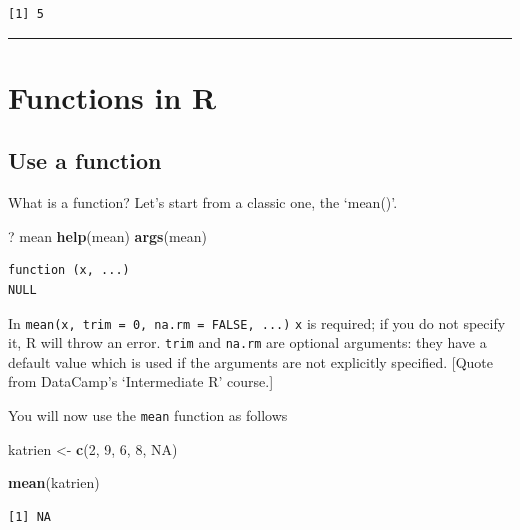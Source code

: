 \documentclass[
]{book}
\newenvironment{Shaded}{\begin{snugshade}}{\end{snugshade}}
\newcommand{\DecValTok}[1]{\textcolor[rgb]{0.00,0.00,0.81}{#1}}
\newcommand{\KeywordTok}[1]{\textcolor[rgb]{0.13,0.29,0.53}{\textbf{#1}}}
\newcommand{\NormalTok}[1]{#1}
\newcommand{\OtherTok}[1]{\textcolor[rgb]{0.56,0.35,0.01}{#1}}
\newcommand{\StringTok}[1]{\textcolor[rgb]{0.31,0.60,0.02}{#1}}
\begin{document}
\begin{verbatim}
[1] 5
\end{verbatim}

\begin{center}\rule{0.5\linewidth}{0.5pt}\end{center}

\hypertarget{functions-in-r}{%
\section{Functions in R}\label{functions-in-r}}

\hypertarget{use-a-function}{%
\subsection{Use a function}\label{use-a-function}}

What is a function? Let's start from a classic one, the `mean()'.

\begin{Shaded}
\begin{Highlighting}[]
\NormalTok{? mean}
\KeywordTok{help}\NormalTok{(mean)}
\KeywordTok{args}\NormalTok{(mean)}
\end{Highlighting}
\end{Shaded}

\begin{verbatim}
function (x, ...) 
NULL
\end{verbatim}

In \texttt{mean(x,\ trim\ =\ 0,\ na.rm\ =\ FALSE,\ ...)} \texttt{x} is required; if you do not specify it, R will throw an error. \texttt{trim} and \texttt{na.rm} are optional arguments: they have a default value which is used if the arguments are not explicitly specified. {[}Quote from DataCamp's `Intermediate R' course.{]}

You will now use the \texttt{mean} function as follows

\begin{Shaded}
\begin{Highlighting}[]
\NormalTok{katrien <-}\StringTok{ }\KeywordTok{c}\NormalTok{(}\DecValTok{2}\NormalTok{, }\DecValTok{9}\NormalTok{, }\DecValTok{6}\NormalTok{, }\DecValTok{8}\NormalTok{, }\OtherTok{NA}\NormalTok{)}

\KeywordTok{mean}\NormalTok{(katrien)}
\end{Highlighting}
\end{Shaded}

\begin{verbatim}
[1] NA
\end{verbatim}
\end{document}
